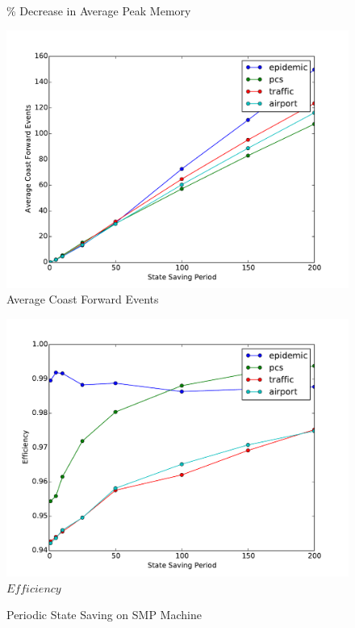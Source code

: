 \documentclass[11pt]{book}
\begin{document}
\begin{figure}
\begin{minipage}{.5\textwidth}
\begin{center}
      \% Decrease in Average Peak Memory \\
    \end{center}
  \end{minipage}
  \begin{minipage}{.5\textwidth}
    \begin{center}
      \includegraphics[width=\textwidth,keepaspectratio,quiet]{figs/state_saving/average_cf.pdf} \\
      Average Coast Forward Events
    \end{center}
  \end{minipage}%
  \hfill
  \begin{minipage}{.5\textwidth}
    \begin{center}
      \includegraphics[width=\textwidth,keepaspectratio,quiet]{figs/state_saving/efficiency.pdf} \\
      $Efficiency$ \\
    \end{center}
  \end{minipage}
  \caption{Periodic State Saving on SMP Machine}\label{ssp_analysis_smp}
\end{figure}
\end{document}
